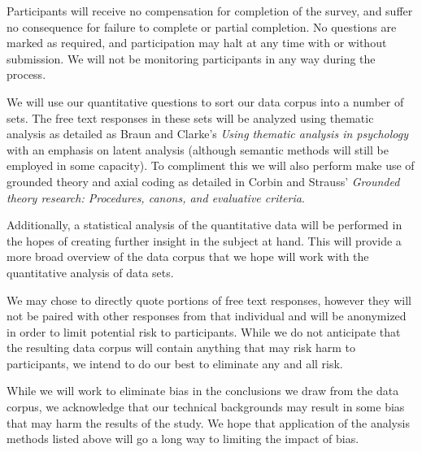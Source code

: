 \documentclass[]{article}
\begin{document}
    Participants will receive no compensation for completion of the survey, and suffer no consequence for failure to complete or partial completion. No questions are marked as required, and participation may halt at any time with or without submission. We will not be monitoring participants in any way during the process.

    We will use our quantitative questions to sort our data corpus into a number of sets. The free text responses in these sets will be analyzed using thematic analysis as detailed as Braun and Clarke's \emph{Using thematic analysis in psychology}\cite{doi:10.1191/1478088706qp063oa} with an emphasis on latent analysis (although semantic methods will still be employed in some capacity). To compliment this we will also perform make use of grounded theory and axial coding as detailed in Corbin and Strauss' \emph{Grounded theory research: Procedures, canons, and evaluative criteria}\cite{Corbin1990}.

    Additionally, a statistical analysis of the quantitative data will be performed in the hopes of creating further insight in the subject at hand. This will provide a more broad overview of the data corpus that we hope will work with the quantitative analysis of data sets.

    We may chose to directly quote portions of free text responses, however they will not be paired with other responses from that individual and will be anonymized in order to limit potential risk to participants. While we do not anticipate that the resulting data corpus will contain anything that may risk harm to participants, we intend to do our best to eliminate any and all risk.

    While we will work to eliminate bias in the conclusions we draw from the data corpus, we acknowledge that our technical backgrounds may result in some bias that may harm the results of the study. We hope that application of the analysis methods listed above will go a long way to limiting the impact of bias.

    \medskip

    
    
		
\end{document}
